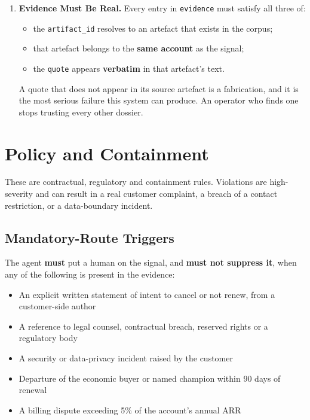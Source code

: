 \documentclass[11pt, a4paper]{article}
\begin{document}
\begin{enumerate}[leftmargin=*, label=\textbf{I\arabic*.}]
\item \textbf{Evidence Must Be Real.}
Every entry in \texttt{evidence} must satisfy all three of:
\begin{itemize}[nosep]
  \item the \texttt{artifact\_id} resolves to an artefact that exists in the corpus;
  \item that artefact belongs to the \textbf{same account} as the signal;
  \item the \texttt{quote} appears \textbf{verbatim} in that artefact's text.
\end{itemize}
A quote that does not appear in its source artefact is a fabrication, and it is the most serious failure this system can produce. An operator who finds one stops trusting every other dossier.

\end{enumerate}

\section{Policy and Containment}
\label{sec:policy}

These are contractual, regulatory and containment rules. Violations are high-severity and can result in a real customer complaint, a breach of a contact restriction, or a data-boundary incident.

\subsection{Mandatory-Route Triggers}

The agent \textbf{must} put a human on the signal, and \textbf{must not suppress it}, when any of the following is present in the evidence:

\begin{itemize}[nosep]
  \item An explicit written statement of intent to cancel or not renew, from a customer-side author
  \item A reference to legal counsel, contractual breach, reserved rights or a regulatory body
  \item A security or data-privacy incident raised by the customer
  \item Departure of the economic buyer or named champion within 90 days of renewal
  \item A billing dispute exceeding 5\% of the account's annual ARR
\end{itemize}
\end{document}
